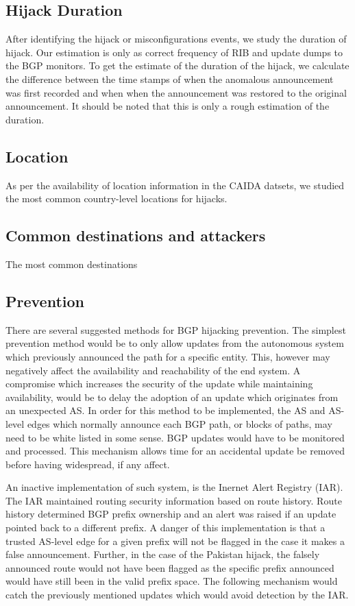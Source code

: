 \subsection{Hijack Duration}
After identifying the hijack or misconfigurations events, we study the duration of hijack. Our estimation is only as correct frequency of RIB and update dumps to the BGP monitors. To get the estimate of the duration of the hijack, we calculate the difference between the time stamps of when the anomalous announcement was first recorded and when when the announcement was restored to the original announcement. It should be noted that this is only a rough estimation of the duration. 
\subsection{Location}
As per the availability of location information in the CAIDA datsets, we studied the most common country-level locations for hijacks. 
\subsection{Common destinations and attackers}
The most common destinations 
\subsection{Prevention}
 There are several suggested methods for BGP hijacking prevention. The simplest prevention method would be to only allow updates from the autonomous system which previously announced the path for a specific entity. This, however may negatively affect the availability and reachability of the end system. A compromise which increases the security of the update while maintaining availability, would be to delay the adoption of an update which originates from an unexpected AS. In order for this method to be implemented, the AS and AS-level edges which normally announce each BGP path, or blocks of paths, may need to be white listed in some sense. BGP updates would have to be monitored and processed. This mechanism allows time for an accidental update be removed before having widespread, if any affect. 
 
An inactive implementation of such system, is the Inernet Alert Registry (IAR). The IAR  maintained routing security information based on route history. Route history determined BGP prefix ownership and an alert was raised if an update pointed back to a different prefix. A danger of this implementation is that a trusted AS-level edge for a given prefix will not be flagged in the case it makes a false announcement. Further, in the case of the Pakistan hijack, the falsely announced route would not have been flagged as the specific prefix announced would have still been in the valid prefix space. The following mechanism would catch the previously mentioned updates which would avoid detection by the IAR.

